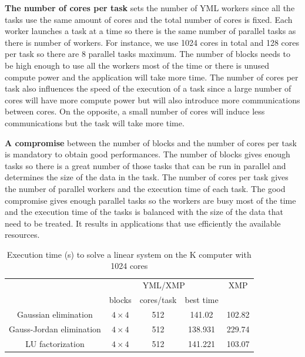 \textbf{The number of cores per task} sets the number of YML workers since all the tasks use the same amount of cores and the total number of cores is fixed.
Each worker launches a task at a time so there is the same number of parallel tasks as there is number of workers.
For instance, we use 1024 cores in total and 128 cores per task so there are 8 parallel tasks maximum.
The number of blocks needs to be high enough to use all the workers most of the time or there is unused compute power and the application will take more time.
The number of cores per task also influences the speed of the execution of a task since a large number of cores will have more compute power but will also introduce more communications between cores.
On the opposite, a small number of cores will induce less communications but the task will take more time.

\textbf{A compromise} between the number of blocks and the number of cores per task is mandatory to obtain good performances.
The number of blocks gives enough tasks so there is a great number of those tasks that can be run in parallel and determines the size of the data in the task.
The number of cores per task gives the number of parallel workers and the execution time of each task.
The good compromise gives enough parallel tasks so the workers are busy most of the time and the execution time of the tasks is balanced with the size of the data that need to be treated.
It results in applications that use efficiently the available resources.

\begin{table}[h]
	\caption{Execution time (s) to solve a linear system on the K computer with 1024 cores\label{tab:K_1024p_16384n}}
	\centering
	\begin{tabular}{ccccc}
		                         &      \multicolumn{3}{c}{YML/XMP}      &  XMP   \\
		                         &    blocks    & cores/task & best time &        \\ \hline
		  Gaussian elimination   & $4 \times 4$ &    512     &  141.02   & 102.82 \\
		Gauss-Jordan elimination & $4 \times 4$ &    512     &  138.931  & 229.74 \\
		    LU factorization     & $4 \times 4$ &    512     &  141.221  & 103.07
	\end{tabular}
\end{table}


